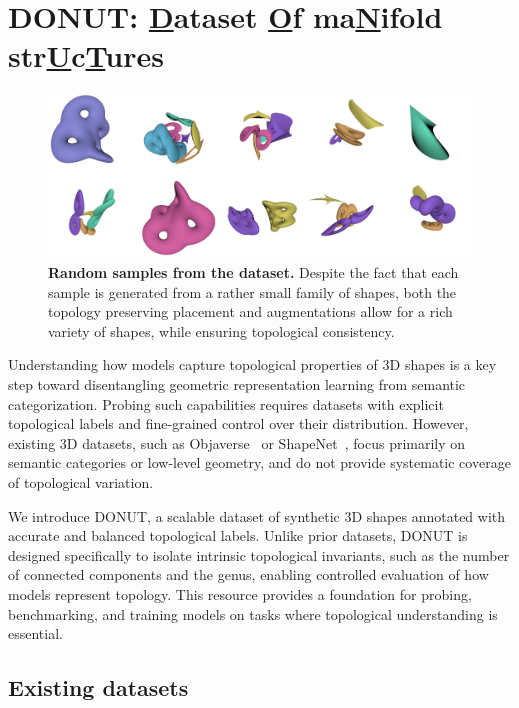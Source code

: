 \section{DONUT: \underline{D}ataset \underline{O}f ma\underline{N}ifold str\underline{U}c\underline{T}ures}
\label{sec:topogen}

\begin{figure}[t]
  \centering
  \includegraphics[width=1.0\linewidth]{figs/topogen/samples_overview.png}

  \label{fig:topogen-samples}
  \caption{\textbf{Random samples from the dataset.} Despite the fact that each sample is generated from a rather small family of shapes, both the topology preserving placement and augmentations allow for a rich variety of shapes, while ensuring topological consistency.}
  \label{fig:short}
\end{figure}


Understanding how models capture topological properties of 3D shapes is a key step toward disentangling geometric representation learning from semantic categorization. Probing such capabilities requires datasets with explicit topological labels and fine-grained control over their distribution. However, existing 3D datasets, such as Objaverse~\cite{objaverse,objaverse_xl} or ShapeNet~\cite{shapenet}, focus primarily on semantic categories or low-level geometry, and do not provide systematic coverage of topological variation.

We introduce DONUT, a scalable dataset of synthetic 3D shapes annotated with accurate and balanced topological labels. Unlike prior datasets, DONUT is designed specifically to isolate intrinsic topological invariants, such as the number of connected components and the genus, enabling controlled evaluation of how models represent topology. This resource provides a foundation for probing, benchmarking, and training models on tasks where topological understanding is essential.

\subsection{Existing datasets}
\label{ssec:existing_datasets}

